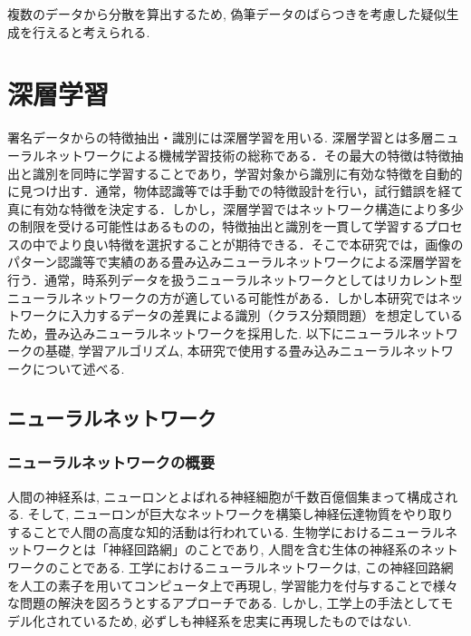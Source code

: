 \noindent
複数のデータから分散を算出するため, 偽筆データのばらつきを考慮した疑似生成を行えると考えられる.

\newpage

\section{深層学習}

署名データからの特徴抽出・識別には深層学習\cite{cite_5}\cite{cite_6}を用いる. 深層学習とは多層ニューラルネットワークによる機械学習技術の総称である．その最大の特徴は特徴抽出と識別を同時に学習することであり，学習対象から識別に有効な特徴を自動的に見つけ出す．通常，物体認識等では手動での特徴設計を行い，試行錯誤を経て真に有効な特徴を決定する．しかし，深層学習ではネットワーク構造により多少の制限を受ける可能性はあるものの，特徴抽出と識別を一貫して学習するプロセスの中でより良い特徴を選択することが期待できる．そこで本研究では，画像のパターン認識等で実績のある畳み込みニューラルネットワークによる深層学習を行う．通常，時系列データを扱うニューラルネットワークとしてはリカレント型ニューラルネットワークの方が適している可能性がある．しかし本研究ではネットワークに入力するデータの差異による識別（クラス分類問題）を想定しているため，畳み込みニューラルネットワークを採用した. 以下にニューラルネットワークの基礎, 学習アルゴリズム, 本研究で使用する畳み込みニューラルネットワークについて述べる.\\

\subsection{ニューラルネットワーク}

\subsubsection{ニューラルネットワークの概要}

人間の神経系は, ニューロンとよばれる神経細胞が千数百億個集まって構成される. そして, ニューロンが巨大なネットワークを構築し神経伝達物質をやり取りすることで人間の高度な知的活動は行われている. 生物学におけるニューラルネットワークとは「神経回路網」のことであり, 人間を含む生体の神経系のネットワークのことである. 工学におけるニューラルネットワークは, この神経回路網を人工の素子を用いてコンピュータ上で再現し, 学習能力を付与することで様々な問題の解決を図ろうとするアプローチである. しかし, 工学上の手法としてモデル化されているため, 必ずしも神経系を忠実に再現したものではない.\\

